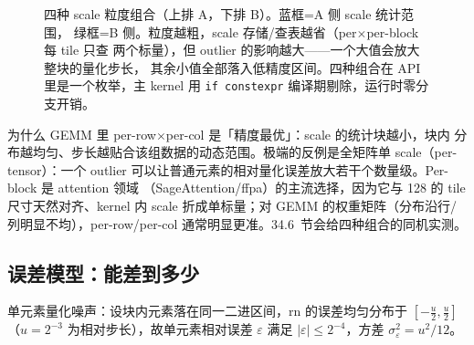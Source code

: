 \begin{figure}[H]
\caption{四种 scale 粒度组合（上排 A，下排 B）。蓝框=A 侧 scale 统计范围，
绿框=B 侧。粒度越粗，scale 存储/查表越省（per$\times$per-block 每 tile 只查
两个标量），但 outlier 的影响越大——一个大值会放大整块的量化步长，
其余小值全部落入低精度区间。四种组合在 API 里是一个枚举，主 kernel 用
\texttt{if constexpr} 编译期剔除，运行时零分支开销。}
\label{fig:34-granularity}
\end{figure}

为什么 GEMM 里 per-row$\times$per-col 是「精度最优」：scale 的统计块越小，块内
分布越均匀、步长越贴合该组数据的动态范围。极端的反例是全矩阵单 scale（per-tensor）：一个 outlier
可以让普通元素的相对量化误差放大若干个数量级。Per-block 是 attention 领域
（SageAttention/ffpa）的主流选择，因为它与 128 的 tile 尺寸天然对齐、kernel 内
scale 折成单标量；对 GEMM 的权重矩阵（分布沿行/列明显不均），per-row/per-col
通常明显更准。34.6~节会给四种组合的同机实测。

\subsection{误差模型：能差到多少}\label{sec:34-err}

单元素量化噪声：设块内元素落在同一二进区间，$\mathrm{rn}$ 的误差均匀分布于
$[-\frac{u}{2}, \frac{u}{2}]$（$u=2^{-3}$ 为相对步长），故单元素相对误差
$\varepsilon$ 满足 $|\varepsilon|\le 2^{-4}$，方差 $\sigma_\varepsilon^2 = u^2/12$。

